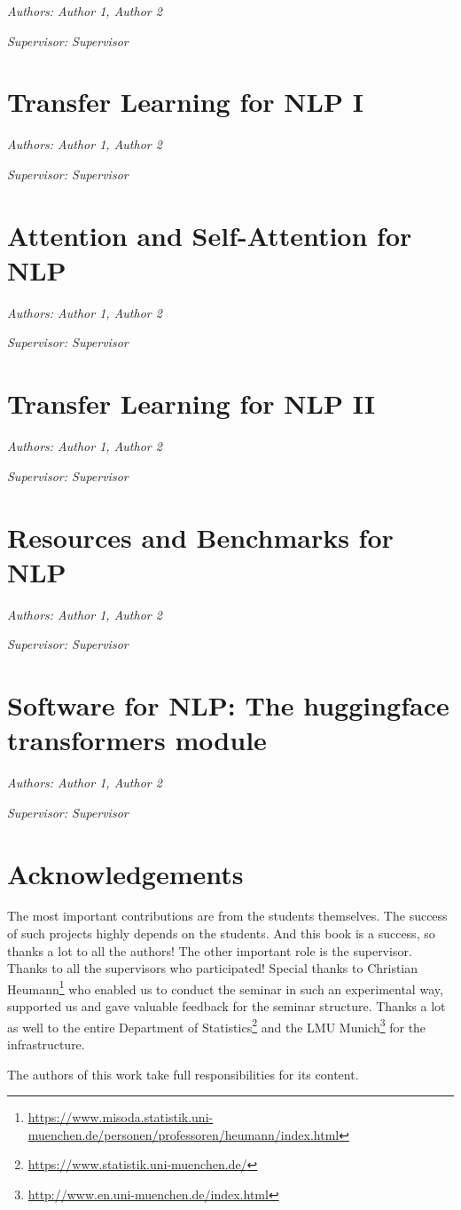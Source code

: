 \documentclass[]{krantz}
\renewcommand{\href}[2]{#2\footnote{\url{#1}}}
\begin{document}
\emph{Authors: Author 1, Author 2}

\emph{Supervisor: Supervisor}

\chapter{Transfer Learning for NLP I}\label{transfer-learning-for-nlp-i}

\emph{Authors: Author 1, Author 2}

\emph{Supervisor: Supervisor}

\chapter{Attention and Self-Attention for
NLP}\label{attention-and-self-attention-for-nlp}

\emph{Authors: Author 1, Author 2}

\emph{Supervisor: Supervisor}

\chapter{Transfer Learning for NLP
II}\label{transfer-learning-for-nlp-ii}

\emph{Authors: Author 1, Author 2}

\emph{Supervisor: Supervisor}

\chapter{Resources and Benchmarks for
NLP}\label{resources-and-benchmarks-for-nlp}

\emph{Authors: Author 1, Author 2}

\emph{Supervisor: Supervisor}

\chapter{Software for NLP: The huggingface transformers
module}\label{software-for-nlp-the-huggingface-transformers-module}

\emph{Authors: Author 1, Author 2}

\emph{Supervisor: Supervisor}

\chapter{Acknowledgements}\label{acknowledgements}

The most important contributions are from the students themselves. The
success of such projects highly depends on the students. And this book
is a success, so thanks a lot to all the authors! The other important
role is the supervisor. Thanks to all the supervisors who participated!
Special thanks to
\href{https://www.misoda.statistik.uni-muenchen.de/personen/professoren/heumann/index.html}{Christian
Heumann} who enabled us to conduct the seminar in such an experimental
way, supported us and gave valuable feedback for the seminar structure.
Thanks a lot as well to the entire
\href{https://www.statistik.uni-muenchen.de/}{Department of Statistics}
and the \href{http://www.en.uni-muenchen.de/index.html}{LMU Munich} for
the infrastructure.

The authors of this work take full responsibilities for its content.



\backmatter
\printindex
\end{document}
